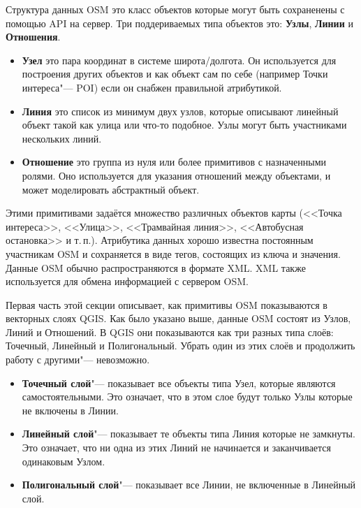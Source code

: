 Структура данных OSM это класс объектов которые могут быть сохраненены с
помощью API на сервер. Три поддериваемых типа объектов это: \textbf{Узлы},
\textbf{Линии} и \textbf{Отношения}.

\begin{itemize}[label=--]
\item \textbf{Узел} это пара координат в системе широта/долгота. Он
используется для построения других объектов и как объект сам по себе
(например Точки интереса"--- POI) если он снабжен правильной атрибутикой.
\item \textbf{Линия} это список из минимум двух узлов, которые описывают
линейный объект такой как улица или что-то подобное. Узлы могут быть
участниками нескольких линий.
\item \textbf{Отношение} это группа из нуля или более примитивов с
назначенными ролями. Оно используется для указания отношений между
объектами, и может моделировать абстрактный объект.
\end{itemize}

Этими примитивами задаётся множество различных объектов карты
(<<Точка интереса>>, <<Улица>>, <<Трамвайная линия>>, <<Автобусная
остановка>> и т.\,п.). Атрибутика данных хорошо известна постоянным
участникам OSM и сохраняется в виде тегов, состоящих из ключа и
значения. Данные OSM обычно распространяются в формате XML. XML также
используется для обмена информацией с сервером OSM.

\label{qgis-osm-connection}

Первая часть этой секции описывает, как примитивы OSM показываются в
векторных слоях QGIS. Как было указано выше, данные OSM состоят из
Узлов, Линий и Отношений. В QGIS они показываются как три разных типа
слоёв: Точечный, Линейный и Полигональный. Убрать один из этих слоёв и
продолжить работу с другими"--- невозможно.

\begin{itemize}[label=--]
\item \textbf{Точечный слой}"--- показывает все объекты типа Узел,
которые являются самостоятельными. Это означает, что в этом слое будут
только Узлы которые не включены в Линии.
\item \textbf{Линейный слой}"--- показывает те объекты типа Линия
которые не замкнуты. Это означает, что ни одна из этих Линий не
начинается и заканчивается одинаковым Узлом.
\item \textbf{Полигональный слой}"--- показывает все Линии, не
включенные в Линейный слой.
\end{itemize}

